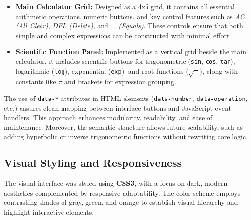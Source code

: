 \documentclass[a4paper,12pt,oneside]{report}
\numberwithin{equation}{chapter}
\numberwithin{figure}{chapter}
\numberwithin{table}{chapter}
\begin{document}
\begin{itemize}
    \item \textbf{Main Calculator Grid:} Designed as a 4x5 grid, it contains all essential arithmetic operations, numeric buttons, and key control features such as \textit{AC (All Clear)}, \textit{DEL (Delete)}, and \textit{= (Equals)}. These controls ensure that both simple and complex expressions can be constructed with minimal effort.
    \item \textbf{Scientific Function Panel:} Implemented as a vertical grid beside the main calculator, it includes scientific buttons for trigonometric (\texttt{sin}, \texttt{cos}, \texttt{tan}), logarithmic (\texttt{log}), exponential (\texttt{exp}), and root functions (\(\sqrt{\phantom{x}}\)), along with constants like \(\pi\) and brackets for expression grouping.

\end{itemize}

The use of \texttt{data-*} attributes in HTML elements (\texttt{data-number}, \texttt{data-operation}, etc.) ensures clean mapping between interface buttons and JavaScript event handlers. This approach enhances modularity, readability, and ease of maintenance. Moreover, the semantic structure allows future scalability, such as adding hyperbolic or inverse trigonometric functions without rewriting core logic.

\subsection{Visual Styling and Responsiveness}

The visual interface was styled using \textbf{CSS3}, with a focus on dark, modern aesthetics complemented by responsive adaptability. The color scheme employs contrasting shades of gray, green, and orange to establish visual hierarchy and highlight interactive elements.
\end{document}
